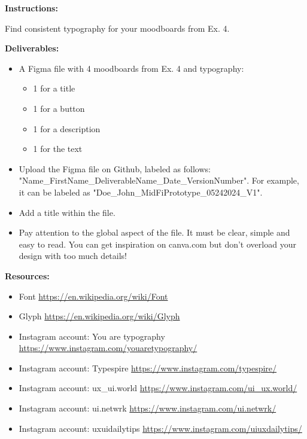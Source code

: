 \makeheaderfiles

\textbf{Instructions:}

Find consistent typography for your moodboards from Ex. 4.

\textbf{Deliverables:}

\begin{itemize}
\item A Figma file with 4 moodboards from Ex. 4 and typography:
\begin{itemize}
\item 1 for a title
\item 1 for a button
\item 1 for a description
\item 1 for the text
\end{itemize}
\item Upload the Figma file on Github, labeled as follows: "Name\_FirstName\_DeliverableName\_Date\_VersionNumber". For example, it can be labeled as "Doe\_John\_MidFiPrototype\_05242024\_V1".
\item Add a title within the file.
\item Pay attention to the global aspect of the file. It must be clear, simple and easy to read. You can get inspiration on canva.com but don't overload your design with too much details!
\end{itemize}

\textbf{Resources:}

\begin{itemize}
\item Font \url{https://en.wikipedia.org/wiki/Font}
\item Glyph \url{https://en.wikipedia.org/wiki/Glyph}
\item Instagram account: You are typography \url{https://www.instagram.com/youaretypography/}
\item Instagram account: Typespire \url{https://www.instagram.com/typespire/}
\item Instagram account: ux\_ui.world \url{https://www.instagram.com/ui_ux.world/}
\item Instagram account: ui.netwrk \url{https://www.instagram.com/ui.netwrk/}
\item Instagram account: uxuidailytips \url{https://www.instagram.com/uiuxdailytips/}
\end{itemize}

